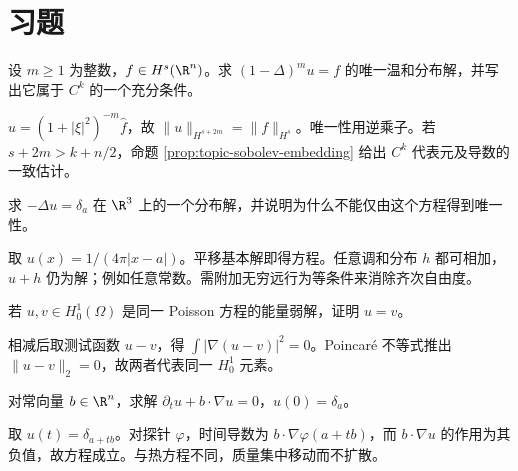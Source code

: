 \section{习题}
\begin{exercise}[迭代的正则性增益]
设 $m\ge1$ 为整数，$f\in H^s(\R^n)$。求 $(1-\Delta)^mu=f$ 的唯一温和分布解，并写出它属于 $C^k$ 的一个充分条件。
\end{exercise}
\begin{solution}
$\widehat u=(1+|\xi|^2)^{-m}\widehat f$，故 $\|u\|_{H^{s+2m}}=\|f\|_{H^s}$。唯一性用逆乘子。若 $s+2m>k+n/2$，命题 \ref{prop:topic-sobolev-embedding} 给出 $C^k$ 代表元及导数的一致估计。
\end{solution}
\begin{exercise}[三维点源]
求 $-\Delta u=\delta_a$ 在 $\R^3$ 上的一个分布解，并说明为什么不能仅由这个方程得到唯一性。
\end{exercise}
\begin{solution}
取 $u(x)=1/(4\pi|x-a|)$。平移基本解即得方程。任意调和分布 $h$ 都可相加，$u+h$ 仍为解；例如任意常数。需附加无穷远行为等条件来消除齐次自由度。
\end{solution}
\begin{exercise}[能量唯一性]
若 $u,v\in H_0^1(\Omega)$ 是同一 Poisson 方程的能量弱解，证明 $u=v$。
\end{exercise}
\begin{solution}
相减后取测试函数 $u-v$，得 $\int|\nabla(u-v)|^2=0$。Poincaré 不等式推出 $\|u-v\|_2=0$，故两者代表同一 $H_0^1$ 元素。
\end{solution}
\begin{exercise}[输运的点质量]
对常向量 $b\in\R^n$，求解 $\partial_tu+b\cdot\nabla u=0$，$u(0)=\delta_a$。
\end{exercise}
\begin{solution}
取 $u(t)=\delta_{a+tb}$。对探针 $\varphi$，时间导数为 $b\cdot\nabla\varphi(a+tb)$，而 $b\cdot\nabla u$ 的作用为其负值，故方程成立。与热方程不同，质量集中移动而不扩散。
\end{solution}
